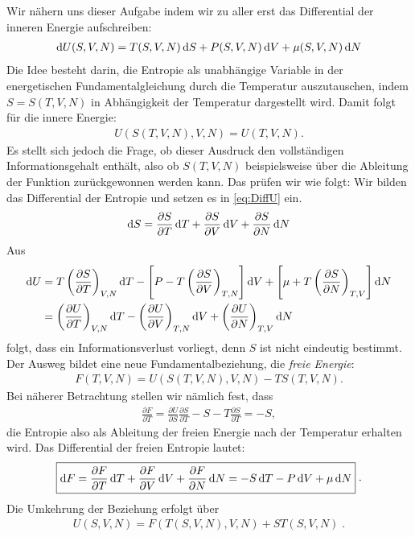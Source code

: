 Wir nähern uns dieser Aufgabe indem wir zu aller erst das Differential der inneren Energie aufschreiben:
\begin{align}
    \label{eq:DiffU}
    \mathop{}\!\mathrm{d} U(S,V,N)=T(S,V,N)\mathop{}\!\mathrm{d} S+P(S,V,N)\mathop{}\!\mathrm{d} V+\mu(S,V,N)\mathop{}\!\mathrm{d} N
\end{align}
Die Idee besteht darin, die Entropie als unabhängige Variable in der energetischen Fundamentalgleichung durch die Temperatur auszutauschen, indem $S=S(T,V,N)$ in Abhängigkeit der Temperatur dargestellt wird. Damit folgt für die innere Energie:
\begin{align*}
    U(S(T,V,N),V,N)=U(T,V,N).
\end{align*}  
Es stellt sich jedoch die Frage, ob dieser Ausdruck den vollständigen Informationsgehalt enthält, also ob $S(T,V,N)$ beispielsweise über die Ableitung der Funktion zurückgewonnen werden kann.
Das prüfen wir wie folgt: Wir bilden das Differential der Entropie und setzen es in \ref{eq:DiffU} ein.
\begin{align*}
    \mathop{}\!\mathrm{d} S=\frac{\partial S}{\partial T}\mathop{}\!\mathrm{d} T+\frac{\partial S}{\partial V}\mathop{}\!\mathrm{d} V+\frac{\partial S}{\partial N}\mathop{}\!\mathrm{d} N
\end{align*}
Aus
\begin{align*}
    \mathop{}\!\mathrm{d} U &= T\left(\frac{\partial S}{\partial T}\right)_{V,N}\mathop{}\!\mathrm{d} T-\left[P-T\left(\frac{\partial S}{\partial V}\right)_{T,N}\right]\mathop{}\!\mathrm{d} V+\left[\mu+T\left(\frac{\partial S}{\partial N}\right)_{T,V}\right]\mathop{}\!\mathrm{d} N\\
    &=\left(\frac{\partial U}{\partial T}\right)_{V,N}\mathop{}\!\mathrm{d} T-\left(\frac{\partial U}{\partial V}\right)_{T,N}\mathop{}\!\mathrm{d} V+\left(\frac{\partial U}{\partial N}\right)_{T,V}\mathop{}\!\mathrm{d} N
\end{align*}
folgt, dass ein Informationsverlust vorliegt, denn $S$ ist nicht eindeutig bestimmt.
Der Ausweg bildet eine neue Fundamentalbeziehung, die \emph{freie Energie}:
\begin{align*}
    \boxed{F(T,V,N)=U(S(T,V,N),V,N)-TS(T,V,N)}.
\end{align*}
Bei näherer Betrachtung stellen wir nämlich fest, dass
\begin{align*}
    \frac{\partial  F}{\partial T}=\frac{\partial U}{\partial S}\frac{\partial S}{\partial T}-S-T\frac{\partial S}{\partial T}=-S,
\end{align*}
die Entropie also als Ableitung der freien Energie nach der Temperatur erhalten wird.
Das Differential der freien Entropie lautet:
\begin{align*}
    \boxed{  
        \begin{aligned}
         \mathop{}\!\mathrm{d} F = \frac{\partial F}{\partial T}\mathop{}\!\mathrm{d} T +\frac{\partial F}{\partial V}\mathop{}\!\mathrm{d} V+\frac{\partial F}{\partial N}\mathop{}\!\mathrm{d} N=-S\mathop{}\!\mathrm{d} T - P\mathop{}\!\mathrm{d} V+\mu \mathop{}\!\mathrm{d} N   
        \end{aligned} 
    }\;.
\end{align*}
Die Umkehrung der Beziehung erfolgt über
\begin{align*}
    \boxed{U(S,V,N)=F(T(S,V,N),V,N)+ST(S,V,N)}\;.
\end{align*}
